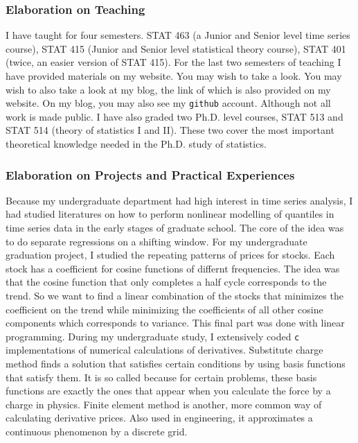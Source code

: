 \documentclass[utf8,letterpaper,oneside]{article}
\begin{document}
\subsubsection*{Elaboration on Teaching}
I have taught for four semesters. STAT 463 (a Junior and Senior level time series course), STAT 415 (Junior and Senior level statistical theory course), STAT 401 (twice, an easier version of STAT 415). For the last two semesters of teaching I have provided materials on my website. You may wish to take a look. You may wish to also take a look at my blog, the link of which is also provided on my website. On my blog, you may also see my \texttt{github} account. Although not all work is made public. I have also graded two Ph.D. level courses, STAT 513 and STAT 514 (theory of statistics I and II). These two cover the most important theoretical knowledge needed in the Ph.D. study of statistics.
\subsubsection*{Elaboration on Projects and Practical Experiences}
Because my undergraduate department had high interest in time series analysis, I had studied literatures on how to perform nonlinear modelling of quantiles in time series data in the early stages of graduate school. The core of the idea was to do separate regressions on a shifting window. For my undergraduate graduation project, I studied the repeating patterns of prices for stocks. Each stock has a coefficient for cosine functions of differnt frequencies. The idea was that the cosine function that only completes a half cycle corresponds to the trend. So we want to find a linear combination of the stocks that minimizes the coefficient on the trend while minimizing the coefficients of all other cosine components which corresponds to variance. This final part was done with linear programming. During my undergraduate study, I extensively coded \texttt{c} implementations of numerical calculations of derivatives. Substitute charge method finds a solution that satisfies certain conditions by using basis functions that satisfy them. It is so called because for certain problems, these basis functions are exactly the ones that appear when you calculate the force by a charge in physics. Finite element method is another, more common way of calculating derivative prices. Also used in engineering, it approximates a continuous phenomenon by a discrete grid.
\end{document}
